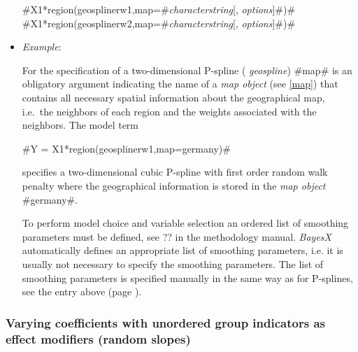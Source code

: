 \begin{itemize}
#X1*region(geosplinerw1,map=#{\em characterstring}[, {\em options}]#)#
#X1*region(geosplinerw2,map=#{\em characterstring}[, {\em options}]#)#
\item[] {\em Example}:

For the specification of a two-dimensional P-spline ({\em
geospline}) #map# is an obligatory argument indicating the name of
a {\em map object} (see \autoref{map}) that contains all necessary
spatial information about the geographical map, i.e.~the neighbors
of each region and the weights associated with the neighbors. The
model term

#Y = X1*region(geosplinerw1,map=germany)#

specifies a two-dimensional cubic P-spline with first order random
walk penalty where the geographical information is stored in the
{\em map object} #germany#.

To perform model choice and variable selection an ordered list of smoothing parameters must be defined, see ??
in the methodology manual. {\em BayesX} automatically defines an appropriate list of smoothing parameters, i.e. it
is usually not necessary to  specify the smoothing parameters.
The list of smoothing parameters is specified manually in the same way as for P-splines,
see the entry above (page \pageref{psplines_stepwise}).
\end{itemize}



\subsubsection*{Varying coefficients with unordered group indicators
as effect modifiers (random slopes)}

